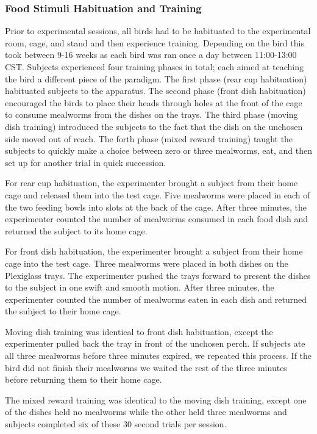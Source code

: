 \documentclass[
  english,
  ,doc,floatsintext]{apa6}
\begin{document}
\hypertarget{food-stimuli-habituation-and-training}{%
\subsubsection{Food Stimuli Habituation and Training}\label{food-stimuli-habituation-and-training}}

Prior to experimental sessions, all birds had to be habituated to the experimental room, cage, and stand and then experience training. Depending on the bird this took between 9-16 weeks as each bird was ran once a day between 11:00-13:00 CST. Subjects experienced four training phases in total; each aimed at teaching the bird a different piece of the paradigm. The first phase (rear cup habituation) habituated subjects to the apparatus. The second phase (front dish habituation) encouraged the birds to place their heads through holes at the front of the cage to consume mealworms from the dishes on the trays. The third phase (moving dish training) introduced the subjects to the fact that the dish on the unchosen side moved out of reach. The forth phase (mixed reward training) taught the subjects to quickly make a choice between zero or three mealworms, eat, and then set up for another trial in quick succession.

For rear cup habituation, the experimenter brought a subject from their home cage and released them into the test cage. Five mealworms were placed in each of the two feeding bowls into slots at the back of the cage. After three minutes, the experimenter counted the number of mealworms consumed in each food dish and returned the subject to its home cage.

For front dish habituation, the experimenter brought a subject from their home cage into the test cage. Three mealworms were placed in both dishes on the Plexiglass trays. The experimenter pushed the trays forward to present the dishes to the subject in one swift and smooth motion. After three minutes, the experimenter counted the number of mealworms eaten in each dish and returned the subject to their home cage.

Moving dish training was identical to front dish habituation, except the experimenter pulled back the tray in front of the unchosen perch. If subjects ate all three mealworms before three minutes expired, we repeated this process. If the bird did not finish their mealworms we waited the rest of the three minutes before returning them to their home cage.

The mixed reward training was identical to the moving dish training, except one of the dishes held no mealworms while the other held three mealworms and subjects completed six of these 30 second trials per session.
\end{document}
